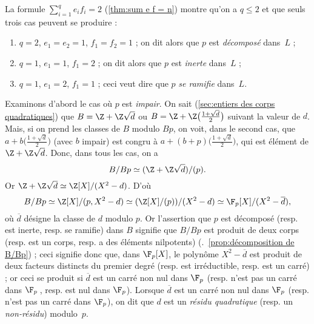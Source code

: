 \documentclass[11pt, useosf,
  title in boldface,
  theorem in new line,
  theorem numbering = section,
  number theorems separately,
]{simplivre}
\begin{document}
    La formule \( \sum_{i=1}^q e_i f_i = 2 \) (\cref{thm:sum e f = n}) montre qu'on a \( q \leqslant 2 \) et que seuls trois cas peuvent se produire :
    \begin{enumerate}
        \item \( q = 2 \), \( e_1 = e_2 = 1 \), \( f_1 = f_2 = 1 \) ; on dit alors que \( p \) est \emph{décomposé} dans~\( L \) ;
        \item \( q = 1 \), \( e_1 = 1 \), \( f_1 = 2 \) ; on dit alors que \( p \) est \emph{inerte} dans~\( L \) ;
        \item \( q = 1 \), \( e_1 = 2 \), \( f_1 = 1 \) ; ceci veut dire que \( p \) \emph{se ramifie} dans~\( L \).
    \end{enumerate}
    Examinons d'abord le cas où \( p \) est \emph{impair}. On sait (\cref{sec:entiers des corps quadratiques}) que \( B = \Z + \Z \sqrt{d} \) ou \( B = \Z + \Z \bigl(\frac{1+\sqrt{d}}{2}\bigr) \) suivant la valeur de \( d \). Mais, si on prend les classes de \( B \) modulo \( Bp \), on voit, dans le second cas, que \( a+b\bigl(\frac{1+\sqrt{d}}{2}\bigr) \) (avec \( b \) impair) est congru à \( a + (b+p) \bigl(\frac{1+\sqrt{d}}{2}\bigr) \), qui est élément de \( \Z + \Z \sqrt{d} \). Donc, dans tous les cas, on a
    \[
        B/Bp \simeq (\Z + \Z \sqrt{d}) / (p).
    \]
    Or \( \Z + \Z \sqrt{d} \simeq \Z[X]/(X^2-d) \). D'où
    \[
        B/Bp \simeq \Z[X]/(p,X^2-d) \simeq (\Z[X]/(p))/(X^2-d) \simeq \F_p[X]/(X^2-\overline{d}),
    \]
    où \( \overline{d} \) désigne la classe de \( d \) modulo \( p \). Or l'assertion que \( p \) est décomposé (resp. est inerte, resp. se ramifie) dans \( B \) signifie que \( B/Bp \) est produit de deux corps (resp. est un corps, resp. a des éléments nilpotents) (\cf.~\cref{prop:décomposition de B/Bp}) ; ceci signifie donc que, dans \( \F_p[X] \), le polynôme \( X^2-\overline{d} \) est produit de deux facteurs distincts du premier degré (resp. est irréductible, resp. est un carré) ; or ceci se produit si \( \overline{d} \) est un carré non nul dans \( \F_p \) (resp. n'est pas un carré dans \( \F_p \)\,, resp. est nul dans \( \F_p \)). Lorsque \( \overline{d} \) est un carré non nul dans \( \F_p \) (resp. n'est pas un carré dans \( \F_p \)), on dit que \( d \) est un \emph{résidu quadratique} (resp. un \emph{non-résidu}) modulo~\( p \).
\end{document}
